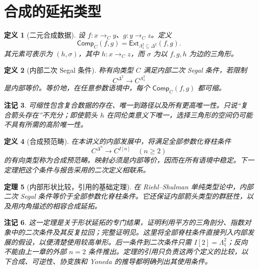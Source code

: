 \documentclass[12pt,oneside,openany,fontset=none]{ctexbook}
\theoremstyle{cn}
\newtheorem{definition}{定义}[chapter]
\newtheorem{theorem}[definition]{定理}
\newtheorem{remark}[definition]{注记}
\numberwithin{equation}{chapter}
\newcommand{\Ext}{\mathsf{Ext}}
\newcommand{\Comp}{\mathsf{Comp}}
\begin{document}
\section{合成的延拓类型}
\begin{definition}[二元合成数据]
设 $f:x\to_Cy$、$g:y\to_Cz$。定义
\[
\Comp_C(f,g)=\Ext_{\Lambda_1^2\subseteq\Delta^2}(f,g).
\]
其元素可表示为 $(h,\sigma)$，其中 $h:x\to_Cz$，而 $\sigma$ 为以 $f,g,h$ 为边的三角形。
\end{definition}
\begin{definition}[内部二次 Segal 条件]
称有向类型 $C$ 满足内部二次 Segal 条件，若限制
\[
C^{\Delta^2}\longrightarrow C^{\Lambda_1^2}
\]
是内部等价。等价地，在任意参数语境中，每个 $\Comp_C(f,g)$ 都可缩。
\end{definition}
\begin{remark}
可缩性包含复合数据的存在、唯一到路径以及所有更高唯一性。只说“复合箭头存在”不充分；即使箭头 $h$ 在同伦类意义下唯一，选择三角形的空间仍可能不具有所需的高阶唯一性。
\end{remark}
\begin{definition}[合成预范畴]
在本讲义的内部发展中，将满足全部参数化脊柱条件
\[
C^{\Delta^n}\longrightarrow C^{I[n]}
\quad(n\ge2)
\]
的有向类型称为合成预范畴。映射必须是内部等价，因而在所有语境中稳定。下一定理把这个条件与报告采用的二次定义相联系。
\end{definition}
\begin{theorem}[内部形状比较，引用的基础定理]\label{thm:internal-segal}
在 Riehl--Shulman 单纯类型论中，内部二次 Segal 条件等价于全部参数化脊柱条件。它还保证内部箭头类型的群胚性，以及用内角描述的相容合成延拓。
\end{theorem}
\begin{remark}
这一定理是关于形状延拓的专门结果，证明利用平方的三角剖分、指数对象中的二次条件及其反复拉回；完整证明见\cite[第5节]{RiehlShulman}。这里将全部脊柱条件直接列入内部发展的假设，以便清楚使用较高单形。后一条件到二次条件只需 $I[2]=\Lambda_1^2$；反向不能由上一章的外部 $n=2$ 条件推出。定理的引用只负责这两个定义的比较，以下合成、可逆性、协变族和 Yoneda 的推导都明确列出其使用条件。
\end{remark}
\end{document}
